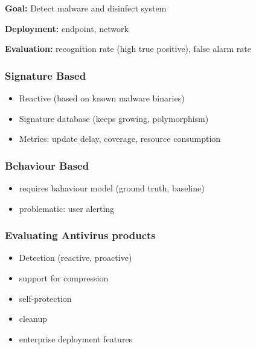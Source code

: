 \documentclass[english, leagacyboxes, nologo]{latex4ei/latex4ei_sheet}
\begin{document}
{  \textbf{Goal:} Detect malware and disinfect system

  \textbf{Deployment:} endpoint, network

  \textbf{Evaluation:} recognition rate (high true positive), false alarm rate


  \subsubsection{Signature Based}
  \begin{itemize}
    \item Reactive (based on known malware binaries)
    \item Signature database (keeps growing, polymorphism)
    \item Metrics: update delay, coverage, resource consumption
   \end{itemize}

     \subsubsection{Behaviour Based}
  \begin{itemize}
    \item requires bahaviour model (ground truth, baseline)
    \item problematic: user alerting
   \end{itemize}

   \subsubsection{Evaluating Antivirus products}

   \begin{itemize}
      \item Detection (reactive, proactive)
      \item support for compression
      \item self-protection
      \item cleanup
      \item enterprise deployment features
    \end{itemize}
  }  \sectionbox{
}
\end{document}
